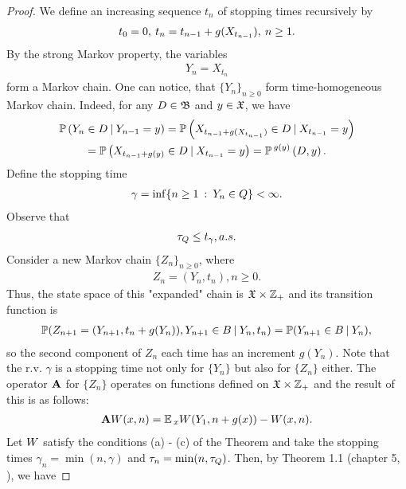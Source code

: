 	\begin{proof}
		We define an increasing sequence $t_{n}$ of stopping times recursively by
		\begin{gather*}
		t_{0} = 0, \: t_{n} = t_{n-1} + g(X_{t_{n-1}}), \: n \geq 1.
		\end{gather*}
		By the strong Markov property, the variables
		\begin{gather*}
		Y_{n} = X_{t_{n}}
		\end{gather*}
		form a Markov chain. One can notice, that $\{Y_{n}\}_{n \geq 0}$ form time-homogeneous Markov chain. Indeed, for any $D \in \mathfrak{B}$ and $y \in \mathfrak{X}$, we have
		\begin{gather*}
		\operatorname*{\mathbb{P}}\left(Y_{n} \in D \: | \: Y_{n-1} = y\right) = \operatorname*{\mathbb{P}}\left(X_{t_{n-1} + g(X_{t_{n-1}})} \in D \: | \: X_{t_{n-1}} = y\right) \\ = \operatorname*{\mathbb{P}}\left(X_{t_{n-1} + g(y)} \in D \: | \: X_{t_{n-1}} = y\right) = \operatorname*{\mathbb{P}}{}^{g(y)}\left(D, y\right).
		\end{gather*}
		Define the stopping time
		\begin{gather*}
		\gamma = \inf\{n \geq 1 \: : \: Y_{n} \in Q\} < \infty.
		\end{gather*}
		Observe that
		\begin{gather*}
		\tau_{Q} \leq t_{\gamma}, a.s.
		\end{gather*}
		Consider a new Markov chain $\{Z_{n}\}_{n \geq 0}$, where
		\begin{gather*}
		Z_{n} = (Y_{n}, t_{n}), n \geq 0.
		\end{gather*}
		Thus, the state space of this "expanded"$ $ chain is $\mathfrak{X} \times \mathbb{Z}_{+}$ and its transition function is
		\begin{gather*}
		\operatorname*{\mathbb{P}}(Z_{n+1} = (Y_{n+1}, t_{n}+g(Y_{n})), Y_{n+1} \in B \: | \: Y_{n}, t_{n}) = \operatorname*{\mathbb{P}}(Y_{n+1} \in B \: | \: Y_{n}),
		\end{gather*}
		so the second component of $Z_{n}$ each time has an increment $g(Y_{n})$. Note that the r.v. $\gamma$ is a stopping time not only for $\{Y_{n}\}$ but also for $\{Z_{n}\}$ either. The operator $\mathbf{A}$ for $\{Z_{n}\}$ operates on functions defined on $\mathfrak{X} \times \mathbb{Z}_{+}$ and the result of this is as follows:
		\begin{gather*}
		\mathbf{A}W(x, n) = \operatorname*{\mathbb{E}}{}_{x}W(Y_{1}, n+g(x)) - W(x, n).
		\end{gather*}
		Let $W$ satisfy the conditions (a) - (c) of the Theorem and take the stopping times $\gamma_{n} = \min(n, \gamma)$ and $\tau_{n} = \min(n, \tau_{Q})$. Then, by Theorem 1.1 (chapter 5, \cite{Kalashnikov}), we have

\end{proof}
